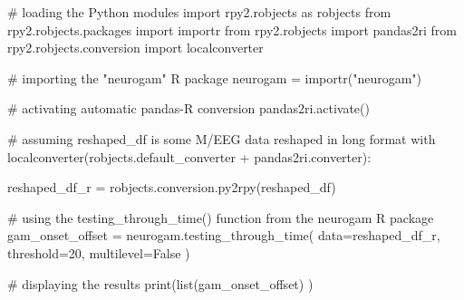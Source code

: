 \documentclass[
  doc,
  floatsintext,
  longtable,
  a4paper,
  nolmodern,
  notxfonts,
  notimes,
  colorlinks=true,linkcolor=blue,citecolor=blue,urlcolor=blue]{apa7}
\newenvironment{Shaded}{\begin{snugshade}}{\end{snugshade}}
\newcommand{\BuiltInTok}[1]{\textcolor[rgb]{0.00,0.23,0.31}{#1}}
\newcommand{\CommentTok}[1]{\textcolor[rgb]{0.37,0.37,0.37}{#1}}
\newcommand{\ControlFlowTok}[1]{\textcolor[rgb]{0.00,0.23,0.31}{#1}}
\newcommand{\DecValTok}[1]{\textcolor[rgb]{0.68,0.00,0.00}{#1}}
\newcommand{\ImportTok}[1]{\textcolor[rgb]{0.00,0.46,0.62}{#1}}
\newcommand{\NormalTok}[1]{\textcolor[rgb]{0.00,0.23,0.31}{#1}}
\newcommand{\OperatorTok}[1]{\textcolor[rgb]{0.37,0.37,0.37}{#1}}
\newcommand{\StringTok}[1]{\textcolor[rgb]{0.13,0.47,0.30}{#1}}
\newcommand{\VariableTok}[1]{\textcolor[rgb]{0.07,0.07,0.07}{#1}}
\begin{document}
\begin{Shaded}
\begin{Highlighting}[]
\CommentTok{\# loading the Python modules}
\ImportTok{import}\NormalTok{ rpy2.robjects }\ImportTok{as}\NormalTok{ robjects}
\ImportTok{from}\NormalTok{ rpy2.robjects.packages }\ImportTok{import}\NormalTok{ importr}
\ImportTok{from}\NormalTok{ rpy2.robjects }\ImportTok{import}\NormalTok{ pandas2ri}
\ImportTok{from}\NormalTok{ rpy2.robjects.conversion }\ImportTok{import}\NormalTok{ localconverter}

\CommentTok{\# importing the "neurogam" R package}
\NormalTok{neurogam }\OperatorTok{=}\NormalTok{ importr(}\StringTok{"neurogam"}\NormalTok{)}

\CommentTok{\# activating automatic pandas{-}R conversion}
\NormalTok{pandas2ri.activate()}

\CommentTok{\# assuming reshaped\_df is some M/EEG data reshaped in long format}
\ControlFlowTok{with}\NormalTok{ localconverter(robjects.default\_converter }\OperatorTok{+}\NormalTok{ pandas2ri.converter):}
    
\NormalTok{    reshaped\_df\_r }\OperatorTok{=}\NormalTok{ robjects.conversion.py2rpy(reshaped\_df)}
    

\CommentTok{\# using the testing\_through\_time() function from the neurogam R package}
\NormalTok{gam\_onset\_offset }\OperatorTok{=}\NormalTok{ neurogam.testing\_through\_time(}
\NormalTok{    data}\OperatorTok{=}\NormalTok{reshaped\_df\_r,}
\NormalTok{    threshold}\OperatorTok{=}\DecValTok{20}\NormalTok{,}
\NormalTok{    multilevel}\OperatorTok{=}\VariableTok{False}
\NormalTok{    )}

\CommentTok{\# displaying the results}
\BuiltInTok{print}\NormalTok{(}\BuiltInTok{list}\NormalTok{(gam\_onset\_offset) )}
\end{Highlighting}
\end{Shaded}
\end{document}
